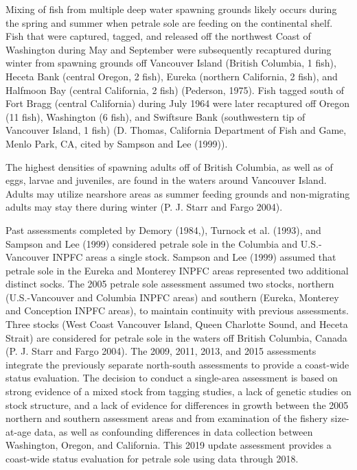 \documentclass[11pt,
  english,
  letterpaper,
]{article}
\begin{document}
Mixing of fish from multiple deep water spawning grounds likely occurs during the spring and summer when petrale sole are feeding on the continental shelf. Fish that were captured, tagged, and released off the northwest Coast of Washington during May and September were subsequently recaptured during winter from spawning grounds off Vancouver Island (British Columbia, 1 fish), Heceta Bank (central Oregon, 2 fish), Eureka (northern California, 2 fish), and Halfmoon Bay (central California, 2 fish) (Pederson, 1975). Fish tagged south of Fort Bragg (central California) during July 1964 were later recaptured off Oregon (11 fish), Washington (6 fish), and Swiftsure Bank (southwestern tip of Vancouver Island, 1 fish) (D. Thomas, California Department of Fish and Game, Menlo Park, CA, cited by Sampson and Lee (1999)).

The highest densities of spawning adults off of British Columbia, as well as of eggs, larvae and juveniles, are found in the waters around Vancouver Island. Adults may utilize nearshore areas as summer feeding grounds and non-migrating adults may stay there during winter (P. J. Starr and Fargo 2004).

Past assessments completed by Demory (1984,), Turnock et al. (1993), and Sampson and Lee (1999) considered petrale sole in the Columbia and U.S.-Vancouver INPFC areas a single stock. Sampson and Lee (1999) assumed that petrale sole in the Eureka and Monterey INPFC areas represented two additional distinct socks. The 2005 petrale sole assessment assumed two stocks, northern (U.S.-Vancouver and Columbia INPFC areas) and southern (Eureka, Monterey and Conception INPFC areas), to maintain continuity with previous assessments. Three stocks (West Coast Vancouver Island, Queen Charlotte Sound, and Heceta Strait) are considered for petrale sole in the waters off British Columbia, Canada (P. J. Starr and Fargo 2004). The 2009, 2011, 2013, and 2015 assessments integrate the previously separate north-south assessments to provide a coast-wide status evaluation. The decision to conduct a single-area assessment is based on strong evidence of a mixed stock from tagging studies, a lack of genetic studies on stock structure, and a lack of evidence for differences in growth between the 2005 northern and southern assessment areas and from examination of the fishery size-at-age data, as well as confounding differences in data collection between Washington, Oregon, and California. This 2019 update assessment provides a coast-wide status evaluation for petrale sole using data through 2018.
\end{document}
